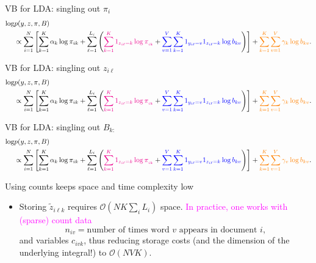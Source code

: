 \documentclass[10pt]{beamer}
\newcommand\un[1]{\textcolor{magenta}{#1}}
\newcommand\unn[1]{\textcolor{blue}{#1}}
\newcommand\unnnn[1]{\textcolor{orange}{#1}}
\def\cO{\mathcal{O}}
\def\blank{\vspace{.5\textheight}}
\begin{document}
\begin{frame}{VB for LDA: singling out $\pi_i$}
  \fontsize{6pt}{7pt}\selectfont
\begin{align*}
\log &p(y, z, \pi, B)\\
     & \propto \sum_{i=1}^N \left[\sum_{k=1}^K \alpha_k \log \pi_{ik} + \sum_{\ell=1}^{L_i} \left(\un{\sum_{k=1}^K 1_{z_{i\ell}=k}\log\pi_{_{ik}}} + \unn{\sum_{v=1}^V \sum_{k=1}^K 1_{y_{i\ell}=v}1_{z_{i\ell}=k} \log b_{kv}}\right)\right] 
    + \unnnn{\sum_{k=1}^K \sum_{v=1}^V \gamma_k\log b_{kv}}.
\end{align*}
\vfill
\blank
\end{frame}

\begin{frame}{VB for LDA: singling out $z_{i\ell}$}
  \fontsize{6pt}{7pt}\selectfont
\begin{align*}
\log &p(y, z, \pi, B)\\
     & \propto \sum_{i=1}^N \left[\sum_{k=1}^K \alpha_k \log \pi_{ik} + \sum_{\ell=1}^{L_i} \left(\un{\sum_{k=1}^K 1_{z_{i\ell}=k}\log\pi_{_{ik}}} + \unn{\sum_{v=1}^V \sum_{k=1}^K 1_{y_{i\ell}=v}1_{z_{i\ell}=k} \log b_{kv}}\right)\right] 
    + \unnnn{\sum_{k=1}^K \sum_{v=1}^V \gamma_k\log b_{kv}}.
\end{align*}
  \vfill
  \blank
\end{frame}

\begin{frame}{VB for LDA: singling out $B_{k:}$}
  \fontsize{6pt}{7pt}\selectfont
\begin{align*}
\log &p(y, z, \pi, B)\\
     & \propto \sum_{i=1}^N \left[\sum_{k=1}^K \alpha_k \log \pi_{ik} + \sum_{\ell=1}^{L_i} \left(\un{\sum_{k=1}^K 1_{z_{i\ell}=k}\log\pi_{_{ik}}} + \unn{\sum_{v=1}^V \sum_{k=1}^K 1_{y_{i\ell}=v}1_{z_{i\ell}=k} \log b_{kv}}\right)\right] 
    + \unnnn{\sum_{k=1}^K \sum_{v=1}^V \gamma_v\log b_{kv}}.
  \end{align*}
  \vfill
  \blank
\end{frame}

\begin{frame}{Using counts keeps space and time complexity low}
\begin{itemize}
  \item Storing $\tilde z_{i\ell k}$ requires $\cO (N K\sum_i L_i )$ space. \un{In practice, one works with (sparse) count data}
  $$
  n_{iv} = \text{number of times word $v$ appears in document $i$},
  $$
  and variables $c_{ivk}$, thus reducing storage costs (and the dimension of the underlying integral!) to $\cO(NVK)$.
\blank
\end{itemize}
\end{frame}
\end{document}
